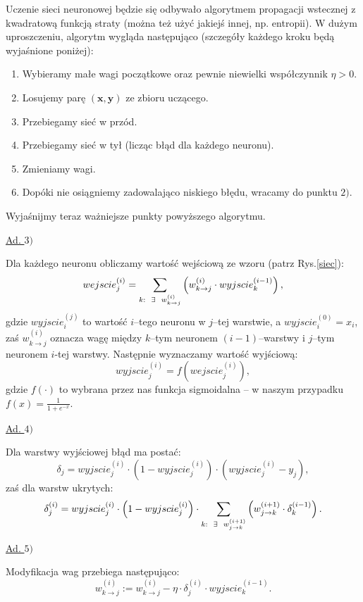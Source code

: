\documentclass{mini}
\begin{document}
Uczenie sieci neuronowej będzie się odbywało algorytmem propagacji wstecznej z kwadratową funkcją straty (można też użyć jakiejś innej, np. entropii). W dużym uproszczeniu, algorytm wygląda następująco (szczegóły każdego kroku będą wyjaśnione poniżej):
\begin{enumerate}
\item Wybieramy małe wagi początkowe oraz pewnie niewielki współczynnik $\eta>0$.
\item Losujemy parę $(\textbf{x},\textbf{y})$ ze zbioru uczącego.
\item Przebiegamy sieć w przód.
\item Przebiegamy sieć w tył (licząc błąd dla każdego neuronu).
\item Zmieniamy wagi.
\item Dopóki nie osiągniemy zadowalająco niskiego błędu, wracamy do punktu $2)$.
\end{enumerate} 

Wyjaśnijmy teraz ważniejsze punkty powyższego algorytmu.

\underline{Ad. $3)$} 

Dla każdego neuronu obliczamy wartość wejściową ze wzoru (patrz Rys.\ref{siec}):
$$
wejscie_j^{(i)} = \sum_{k:\hspace{2mm}\exists\hspace{2mm} w^{(i)}_{k\rightarrow j}} \left( w^{(i)}_{k\rightarrow j}\cdot wyjscie_k^{(i-1)} \right),
$$
gdzie $wyjscie_i^{(j)}$ to wartość $i$--tego neuronu w $j$--tej warstwie, a $wyjscie_i^{(0)} = x_i$, zaś $w^{(i)}_{k\rightarrow j}$ oznacza wagę między $k$--tym neuronem $(i-1)$--warstwy i $j$--tym neuronem $i$-tej warstwy. Następnie wyznaczamy wartość wyjściową:
$$
wyjscie_j^{(i)} = f\left(wejscie_j^{(i)}\right),
$$
gdzie $f(\cdot)$ to wybrana przez nas funkcja sigmoidalna -- w naszym przypadku $f(x) = \frac{1}{1+e^{-x}}$.

\underline{Ad. $4)$}

Dla warstwy wyjściowej błąd ma postać:
$$
\delta_j = wyjscie_j^{(i)}\cdot \left( 1- wyjscie_j^{(i)} \right)\cdot(wyjscie_j^{(i)} - y_j),
$$
zaś dla warstw ukrytych:
$$
\delta_j^{(i)} =  wyjscie_j^{(i)}\cdot \left( 1- wyjscie_j^{(i)} \right) \cdot \sum_{k:\hspace{2mm}\exists\hspace{2mm} w^{(i+1)}_{j\rightarrow k}} \left( w^{(i+1)}_{j\rightarrow k}\cdot \delta_k^{(i-1)} \right).
$$

\underline{Ad. $5)$}

Modyfikacja wag przebiega następująco:
$$
w_{k\rightarrow j}^{(i)} := w_{k\rightarrow j}^{(i)} - \eta\cdot\delta_j^{(i)}\cdot wyjscie^{(i-1)}_k.
$$
\end{document}
